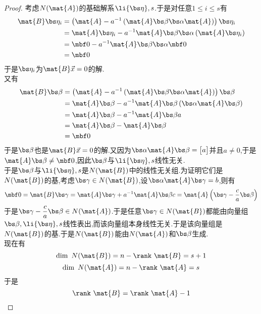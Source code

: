 \documentclass{ctexart}
\begin{document}
\begin{proof}
    考虑$N(\mat{A})$的基础解系$\li{\bs\eta},s$.于是对任意$1\leqslant i\leqslant s$有
    \[\begin{aligned}
        \mat{B}\bs\eta_i
        &=\left(\mat{A}-a^{-1}\left(\mat{A}\bs\beta\bs\alpha\mat{A}\right)\right)\bs\eta_i\\
        &=\mat{A}\bs\eta_i-a^{-1}\mat{A}\bs\beta\bs\alpha\left(\mat{A}\bs\eta_i\right)\\
        &=\mbf0-a^{-1}\mat{A}\bs\beta\bs\alpha\mbf0\\
        &=\mbf0
    \end{aligned}\]
    于是$\bs\eta_i$为$\mat{B}\vec{x}=0$的解.\\
    又有
    \[\begin{aligned}
        \mat{B}\bs\beta
        &=\left(\mat{A}-a^{-1}\left(\mat{A}\bs\beta\bs\alpha\mat{A}\right)\right)\bs\beta\\
        &=\mat{A}\bs\beta-a^{-1}\mat{A}\bs\beta\left(\bs\alpha\mat{A}\bs\beta\right)\\
        &=\mat{A}\bs\beta-a^{-1}\mat{A}\bs\beta a\\
        &=\mat{A}\bs\beta-\mat{A}\bs\beta\\
        &=\mbf0
    \end{aligned}\]
    于是$\bs\beta$也是$\mat{B}\vec{x}=0$的解.又因为$\bs\alpha\mat{A}\bs\beta=\begin{bmatrix}a\end{bmatrix}$并且$a\neq0$,于是$\mat{A}\bs\beta\neq\mbf0$,因此$\bs\beta$与$\li{\bs\eta},s$线性无关.\\
    于是$\bs\beta$与$\li{\bs\eta},s$是$N(\mat{B})$中的线性无关组.为证明它们是$N(\mat{B})$的基,考虑$\bs\gamma\in N(\mat{B})$,设$\bs\alpha\mat{A}\bs\gamma=b$,则有
    \[\mbf0=\mat{B}\bs\gamma=\mat{A}\bs\gamma+a^{-1}\mat{A}\bs\beta c=\mat{A}\left(\bs\gamma-\dfrac{c}{a}\bs\beta\right)\]
    于是$\bs\gamma-\dfrac{c}{a}\bs\beta\in N(\mat{A})$.于是任意$\bs\gamma\in N(\mat{B})$都能由向量组$\bs\beta,\li{\bs\eta},s$线性表出,而该向量组本身线性无关.于是该向量组是$N(\mat{B})$的基.于是$N(\mat{B})$能由$N(\mat{A})$和$\bs\beta$生成.\\
    现在有
    \[\dim\ N(\mat{B})=n-\rank\ \mat{B}=s+1\]
    \[\dim\ N(\mat{A})=n-\rank\ \mat{A}=s\]
    于是
    \[\rank\ \mat{B}=\rank\ \mat{A}-1\]
\end{proof}
\end{document}
